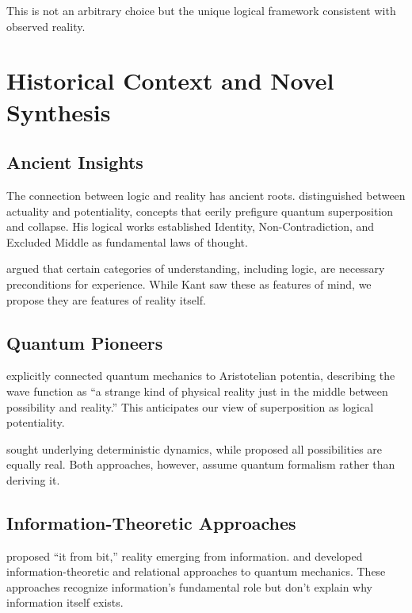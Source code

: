 \documentclass[12pt,a4paper]{article}
\begin{document}
This is not an arbitrary choice but the unique logical framework consistent with observed reality.

\section{Historical Context and Novel Synthesis}

\subsection{Ancient Insights}

The connection between logic and reality has ancient roots. \citet{aristotle_metaphysics} distinguished between actuality and potentiality, concepts that eerily prefigure quantum superposition and collapse. His logical works established Identity, Non-Contradiction, and Excluded Middle as fundamental laws of thought.

\citet{kant1781critique} argued that certain categories of understanding, including logic, are necessary preconditions for experience. While Kant saw these as features of mind, we propose they are features of reality itself.

\subsection{Quantum Pioneers}

\citet{heisenberg1958physics} explicitly connected quantum mechanics to Aristotelian potentia, describing the wave function as ``a strange kind of physical reality just in the middle between possibility and reality.'' This anticipates our view of superposition as logical potentiality.

\citet{bohm1952suggested} sought underlying deterministic dynamics, while \citet{everett1957relative} proposed all possibilities are equally real. Both approaches, however, assume quantum formalism rather than deriving it.

\subsection{Information-Theoretic Approaches}

\citet{wheeler1990information} proposed ``it from bit,'' reality emerging from information. \citet{brukner2001conceptual} and \citet{rovelli1996relational} developed information-theoretic and relational approaches to quantum mechanics. These approaches recognize information's fundamental role but don't explain why information itself exists.
\end{document}
